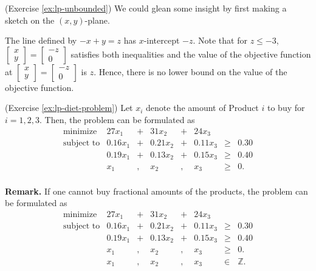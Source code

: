 \begin{solution}(Exercise \ref{ex:lp-unbounded})
We could glean some insight by first making a sketch on the
\((x,y)\)-plane.

The line defined by \(-x + y = z\) has \(x\)-intercept \(-z\). Note
that for \(z \leq -3\),
\(\begin{bmatrix} x\\y \end{bmatrix} = \begin{bmatrix} -z\\ 0\end{bmatrix}\)
satisfies both inequalities and the value of the objective function at
\(\begin{bmatrix} x\\y \end{bmatrix} = \begin{bmatrix} -z\\ 0\end{bmatrix}\)
is \(z\). Hence, there is no lower bound on the value of the objective
function.
\end{solution}

\begin{solution}(Exercise \ref{ex:lp-diet-problem})
Let \(x_i\) denote the amount of Product \(i\) to buy for
\(i = 1,2,3\). Then, the problem can be formulated as
\[
\begin{array}{rrcrcrll}
\mbox{minimize } & 27 x_1 & + & 31 x_2 & + & 24 x_3 \\
\mbox{subject to} 
& 0.16 x_1 & + & 0.21 x_2 & + & 0.11 x_3 & \geq & 0.30 \\
& 0.19 x_1 & + & 0.13 x_2 & + & 0.15 x_3 & \geq & 0.40 \\
& x_1 & , & x_2 & , & x_3 & \geq & 0. \\
\end{array}
\]

\textbf{Remark.} If one cannot buy fractional amounts of the products,
the problem can be formulated as
\[
\begin{array}{rrcrcrll}
\mbox{minimize } & 27 x_1 & + & 31 x_2 & + & 24 x_3 \\
\mbox{subject to} 
& 0.16 x_1 & + & 0.21 x_2 & + & 0.11 x_3 & \geq & 0.30 \\
& 0.19 x_1 & + & 0.13 x_2 & + & 0.15 x_3 & \geq & 0.40 \\
& x_1 & , & x_2 & , & x_3 & \geq & 0. \\
& x_1 & , & x_2 & , & x_3 & \in & \mathbb{Z}. \\
\end{array}
\]
\end{solution}


